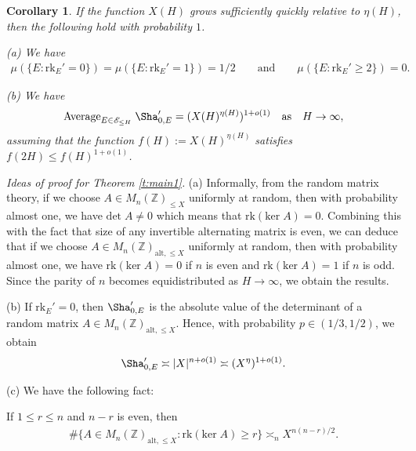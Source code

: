 \documentclass[12pt,reqno]{amsart}
\newtheorem{cor}[thm]{Corollary}
\numberwithin{equation}{section}
\def\Z{{\mathbb Z}}
\def\sE{{\mathscr E}}
\begin{document}
\begin{cor}
If the function $X(H)$ grows sufficiently quickly relative to $\eta(H)$, then the following hold with probability $1$.

\smallskip

\noindent(a) We have
\begin{align*}
\mu(\{E: \text{rk}_E' =0\}) = \mu(\{E: \text{rk}_E' = 1\}) = 1/2  \qquad \text{and} \qquad \mu(\{E: \text{rk}_E' \ge 2\}) = 0.  
\end{align*}

\noindent(b) We have
\begin{align*}
\text{Average}_{E \in \sE_{\le H}} \; \Sha_{0,E}' = (X(H)^{\eta(H)})^{1+o(1)} \quad \text{as} \quad H \to \infty,
\end{align*}
assuming that the function $f(H):=X(H)^{\eta(H)}$ satisfies $f(2H) \le f(H)^{1+o(1)}$.

\end{cor}

\noindent \textit{Ideas of proof for Theorem \ref{t:main1}.} (a) Informally, from the random matrix theory, if we choose $A \in M_n(\Z)_{\le X}$ uniformly at random, then with probability almost one, we have $\text{det} \; A \neq 0$ which means that $\text{rk}(\text{ker} \; A) = 0$. Combining this with the fact that size of any invertible alternating matrix is even, we can deduce that if we choose $A \in M_n(\Z)_{\text{alt}, \le X}$ uniformly at random, then with probability almost one, we have $\text{rk}(\text{ker} \; A) = 0$ if $n$ is even and $\text{rk}(\text{ker} \; A) = 1$ if $n$ is odd. Since the parity of $n$ becomes equidistributed as $H \to \infty$, we obtain the results.

(b) If $\text{rk}_E' =0$, then $\Sha_{0,E}'$ is the absolute value of the determinant of a random matrix $A \in M_n(\Z)_{\text{alt}, \le X}$. Hence, with probability $p \in (1/3, 1/2)$, we obtain
\begin{align*}
\Sha_{0,E}' \asymp |X|^{n+o(1)} \asymp (X^{\eta})^{1+o(1)}.
\end{align*}

(c) We have the following fact:

\smallskip

 \indent \indent If $1 \le r \le n$ and $n-r$ is even, then
\begin{align}\label{counting}
\# \{A \in M_n(\Z)_{\text{alt}, \le X} : \text{rk}(\text{ker} \; A) \ge r \} \asymp_n X^{n(n-r)/2}.
\end{align}
\end{document}
